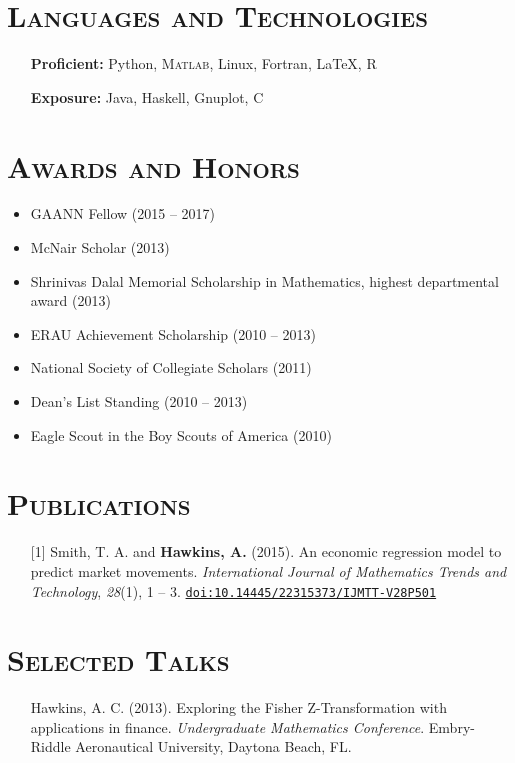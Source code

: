 \documentclass[10pt]{article}
\begin{document}
\section*{\textsc{Languages and Technologies}}
\begin{itemize}
    \item[] \textbf{Proficient:} Python, \textsc{Matlab}, Linux, Fortran, \LaTeX{}, \textsc{R}
    \item[] \textbf{Exposure:} Java, Haskell, Gnuplot, \textsc{C}
\end{itemize}

\section*{\textsc{Awards and Honors}}
\begin{itemize}
    \item GAANN Fellow (2015 -- 2017)
    \item McNair Scholar (2013)
    \item Shrinivas Dalal Memorial Scholarship in Mathematics, highest departmental award (2013)
    \item ERAU Achievement Scholarship (2010 -- 2013)
    \item National Society of Collegiate Scholars (2011)
    \item Dean's List Standing (2010 -- 2013)
    \item Eagle Scout in the Boy Scouts of America (2010)
\end{itemize}

\section*{\textsc{Publications}}
\begin{itemize}[leftmargin=*]
    \item[] [1] Smith, T. A. and \textbf{Hawkins, A.} (2015). An economic regression model to predict market movements. \textit{International Journal of Mathematics Trends and Technology}, \textit{28}(1), 1 -- 3. \texttt{\href{http://dx.doi.org/10.14445/22315373/IJMTT-V28P501}{doi:10.14445/22315373/IJMTT-V28P501}}
\end{itemize}

\section*{\textsc{Selected Talks}}
\begin{itemize}[leftmargin=*]
    \item[] Hawkins, A. C. (2013). Exploring the Fisher Z-Transformation with applications in finance. \textit{Undergraduate Mathematics Conference}. Embry-Riddle Aeronautical University, Daytona Beach, FL.
\end{itemize}
\end{document}
